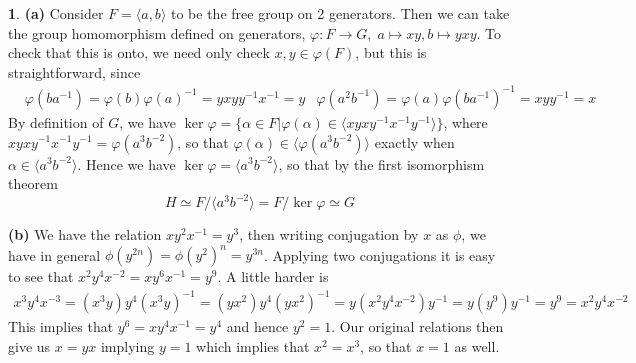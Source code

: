 \documentclass[10.5pt]{article}
\theoremstyle{definition}
\newtheorem{pb}{}
\newcommand{\set}[1]{\{#1\}}
\newcommand{\gen}[1]{\langle #1 \rangle}
\newcommand{\ism}{\simeq}
\begin{document}
    \begin{pb}
        \textbf{(a)}
        Consider \(F = \gen{a,b}\) to be the free group on 2 generators. Then we can take the group homomorphism defined on generators, 
        \(\varphi: F \to G, \;a \mapsto xy, b \mapsto yxy\). To check that this is onto, we need only check \(x,y \in \varphi(F)\), but this is straightforward, since
        \begin{align*}
            &\varphi(ba^{-1}) = \varphi(b)\varphi(a)^{-1} = yxyy^{-1}x^{-1} = y &\varphi(a^2b^{-1}) = \varphi(a)\varphi(ba^{-1})^{-1} = xyy^{-1} = x
        \end{align*}
        By definition of \(G\), we have \(\ker \varphi = \set{\alpha \in F \vert \varphi(\alpha) \in \gen{xyxy^{-1}x^{-1}y^{-1}}}\), where
        \(xyxy^{-1}x^{-1}y^{-1} = \varphi(a^3b^{-2})\), so that \(\varphi(\alpha) \in \gen{\varphi(a^3b^{-2})}\) exactly when \(\alpha \in \gen{a^3b^{-2}}\).
        Hence we have
        \(\ker \varphi = \gen{a^3b^{-2}}\), so that by the first isomorphism theorem \[H \ism F/\gen{a^3b^{-2}} = F/\ker \varphi \ism G\]

        \textbf{(b)} We have the relation \(xy^2x^{-1} = y^3\), then writing conjugation by \(x\) as \(\phi\), we have in general \(\phi(y^{2n}) = \phi(y^2)^n = y^{3n}\).
        Applying two conjugations it is easy to see that \(x^2y^4x^{-2} = xy^6x^{-1} = y^9\). A little harder is
        \begin{align*}
            x^3y^4x^{-3} = (x^3y)y^4(x^3y)^{-1} = (yx^2)y^4(yx^2)^{-1} = y(x^2y^4x^{-2})y^{-1} = y(y^9)y^{-1} = y^9 = x^2y^4x^{-2}
        \end{align*}
        This implies that \(y^6 = xy^4x^{-1} = y^4\) and hence \(y^2 = 1\). Our original relations then give us \(x = yx\) implying \(y=1\) which implies that \(x^2 = x^3\), so that \(x = 1\) as well.
    \end{pb}
\end{document}

